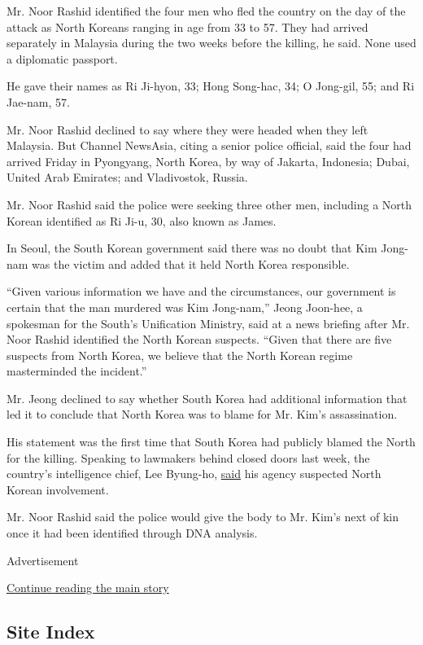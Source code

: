 Mr. Noor Rashid identified the four men who fled the country on the day
of the attack as North Koreans ranging in age from 33 to 57. They had
arrived separately in Malaysia during the two weeks before the killing,
he said. None used a diplomatic passport.

He gave their names as Ri Ji-hyon, 33; Hong Song-hac, 34; O Jong-gil,
55; and Ri Jae-nam, 57.

Mr. Noor Rashid declined to say where they were headed when they left
Malaysia. But Channel NewsAsia, citing a senior police official, said
the four had arrived Friday in Pyongyang, North Korea, by way of
Jakarta, Indonesia; Dubai, United Arab Emirates; and Vladivostok,
Russia.

Mr. Noor Rashid said the police were seeking three other men, including
a North Korean identified as Ri Ji-u, 30, also known as James.

In Seoul, the South Korean government said there was no doubt that Kim
Jong-nam was the victim and added that it held North Korea responsible.

``Given various information we have and the circumstances, our
government is certain that the man murdered was Kim Jong-nam,'' Jeong
Joon-hee, a spokesman for the South's Unification Ministry, said at a
news briefing after Mr. Noor Rashid identified the North Korean
suspects. ``Given that there are five suspects from North Korea, we
believe that the North Korean regime masterminded the incident.''

Mr. Jeong declined to say whether South Korea had additional information
that led it to conclude that North Korea was to blame for Mr. Kim's
assassination.

His statement was the first time that South Korea had publicly blamed
the North for the killing. Speaking to lawmakers behind closed doors
last week, the country's intelligence chief, Lee Byung-ho,
\href{https://www.nytimes.com/2017/02/15/world/asia/kim-jong-nam-assassination-north-korea.html}{said}
his agency suspected North Korean involvement.

Mr. Noor Rashid said the police would give the body to Mr. Kim's next of
kin once it had been identified through DNA analysis.

Advertisement

\protect\hyperlink{after-bottom}{Continue reading the main story}

\hypertarget{site-index}{%
\subsection{Site Index}\label{site-index}}


